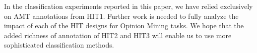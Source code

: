 \documentclass[11pt,letterpaper]{article}
\begin{document}
In the classification experiments reported in this paper, we have relied exclusively on AMT annotations from HIT1. Further work is needed to fully analyze the impact of each of the HIT designs for Opinion Mining tasks. We hope that the added richness of annotation of HIT2 and HIT3 will enable us to use more sophisticated classification methods.






\end{document}
